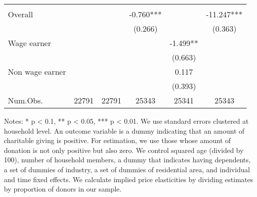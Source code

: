 \begin{table}
\begin{threeparttable}
\begin{tabular}[t]{lccccc}
\midrule
\addlinespace[0.3em]
\multicolumn{6}{l}{\textit{Implied price elasticity}}\\
\hspace{1em}Overall &  &  & -0.760*** &  & -11.247***\\
\hspace{1em} &  &  & (0.266) &  & (0.363)\\
\hspace{1em}Wage earner &  &  &  & -1.499** & \\
\hspace{1em} &  &  &  & (0.663) & \\
\hspace{1em}Non wage earner &  &  &  & 0.117 & \\
\hspace{1em} &  &  &  & (0.393) & \\
Num.Obs. & \num{22791} & \num{22791} & \num{25343} & \num{25341} & \num{25343}\\
\bottomrule
\end{tabular}
\begin{tablenotes}
\item Notes: * p < 0.1, ** p < 0.05, *** p < 0.01. We use standard errors clustered at household level. An outcome variable is a dummy indicating that an amount of charitable giving is positive. For estimation, we use those whose amount of donation is not only positive but also zero. We control squared age (divided by 100), number of household members, a dummy that indicates having dependents, a set of dummies of industry, a set of dummies of residential area, and individual and time fixed effects. We calculate implied price elasticities by dividing estimates by proportion of donors in our sample.
\end{tablenotes}
\end{threeparttable}
\end{table}
